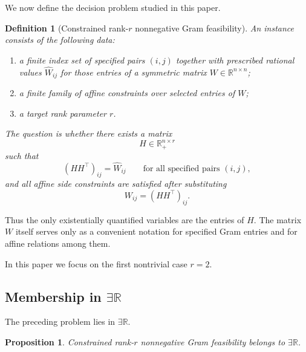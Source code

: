 \documentclass[11pt]{article}
\newtheorem{proposition}[theorem]{Proposition}
\newtheorem{definition}[theorem]{Definition}
\begin{document}
We now define the decision problem studied in this paper.

\begin{definition}[Constrained rank-$r$ nonnegative Gram feasibility]
\label{def:gramfeas}
An instance consists of the following data:
\begin{enumerate}[label=(\roman*)]
\item a finite index set of specified pairs $(i,j)$ together with prescribed
rational values $\widehat{W}_{ij}$ for those entries of a symmetric matrix
$W \in \mathbb{R}^{n\times n}$;
\item a finite family of affine constraints over selected entries of $W$;
\item a target rank parameter $r$.
\end{enumerate}
The question is whether there exists a matrix
\[
H \in \mathbb{R}_+^{n\times r}
\]
such that
\[
(HH^\top)_{ij} = \widehat{W}_{ij}
\qquad \text{for all specified pairs } (i,j),
\]
and all affine side constraints are satisfied after substituting
\[
W_{ij} = (HH^\top)_{ij}.
\]
\end{definition}

Thus the only existentially quantified variables are the entries of $H$.
The matrix $W$ itself serves only as a convenient notation for specified Gram
entries and for affine relations among them.

In this paper we focus on the first nontrivial case $r=2$.

\subsection{Membership in \texorpdfstring{$\exists\mathbb{R}$}{ER}}

The preceding problem lies in $\exists\mathbb{R}$.

\begin{proposition}
\label{prop:er-membership}
Constrained rank-$r$ nonnegative Gram feasibility belongs to
$\exists\mathbb{R}$.
\end{proposition}
\end{document}
